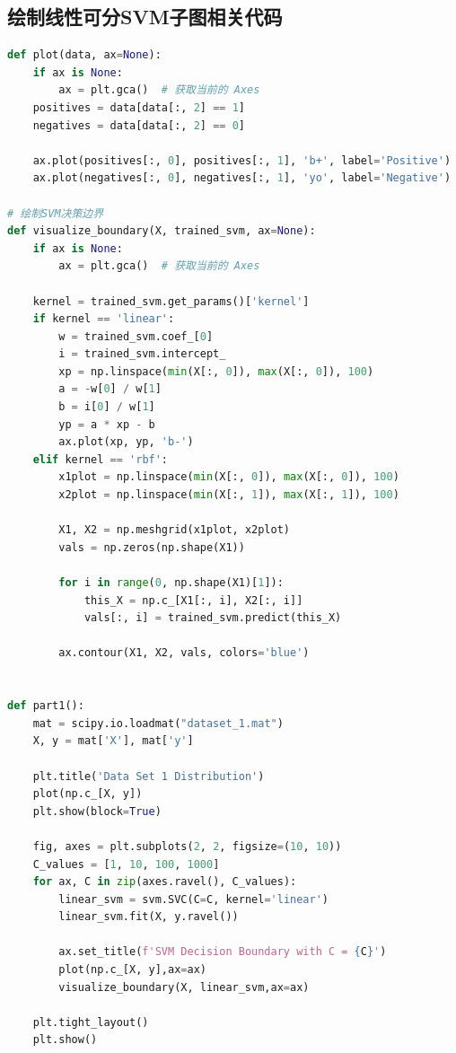 \documentclass{SEU-AI-Report}
\begin{document}
\subsection{绘制线性可分SVM子图相关代码}\label{sec:subfloat}
\begin{lstlisting}[style=codestyle,language=python,caption= 新版part1函数以及相关改动]
def plot(data, ax=None):
    if ax is None:
        ax = plt.gca()  # 获取当前的 Axes
    positives = data[data[:, 2] == 1]
    negatives = data[data[:, 2] == 0]

    ax.plot(positives[:, 0], positives[:, 1], 'b+', label='Positive')
    ax.plot(negatives[:, 0], negatives[:, 1], 'yo', label='Negative')

# 绘制SVM决策边界
def visualize_boundary(X, trained_svm, ax=None):
    if ax is None:
        ax = plt.gca()  # 获取当前的 Axes

    kernel = trained_svm.get_params()['kernel']
    if kernel == 'linear':
        w = trained_svm.coef_[0]
        i = trained_svm.intercept_
        xp = np.linspace(min(X[:, 0]), max(X[:, 0]), 100)
        a = -w[0] / w[1]
        b = i[0] / w[1]
        yp = a * xp - b
        ax.plot(xp, yp, 'b-')
    elif kernel == 'rbf':
        x1plot = np.linspace(min(X[:, 0]), max(X[:, 0]), 100)
        x2plot = np.linspace(min(X[:, 1]), max(X[:, 1]), 100)
        
        X1, X2 = np.meshgrid(x1plot, x2plot)
        vals = np.zeros(np.shape(X1))
        
        for i in range(0, np.shape(X1)[1]):
            this_X = np.c_[X1[:, i], X2[:, i]]
            vals[:, i] = trained_svm.predict(this_X)
        
        ax.contour(X1, X2, vals, colors='blue')


def part1():
	mat = scipy.io.loadmat("dataset_1.mat")
	X, y = mat['X'], mat['y']
    
	plt.title('Data Set 1 Distribution')
	plot(np.c_[X, y])
	plt.show(block=True)
    
	fig, axes = plt.subplots(2, 2, figsize=(10, 10)) 
	C_values = [1, 10, 100, 1000]
	for ax, C in zip(axes.ravel(), C_values):
		linear_svm = svm.SVC(C=C, kernel='linear')
		linear_svm.fit(X, y.ravel())

		ax.set_title(f'SVM Decision Boundary with C = {C}')
		plot(np.c_[X, y],ax=ax)
		visualize_boundary(X, linear_svm,ax=ax)     

	plt.tight_layout()  
	plt.show()
\end{lstlisting}
\end{document}
